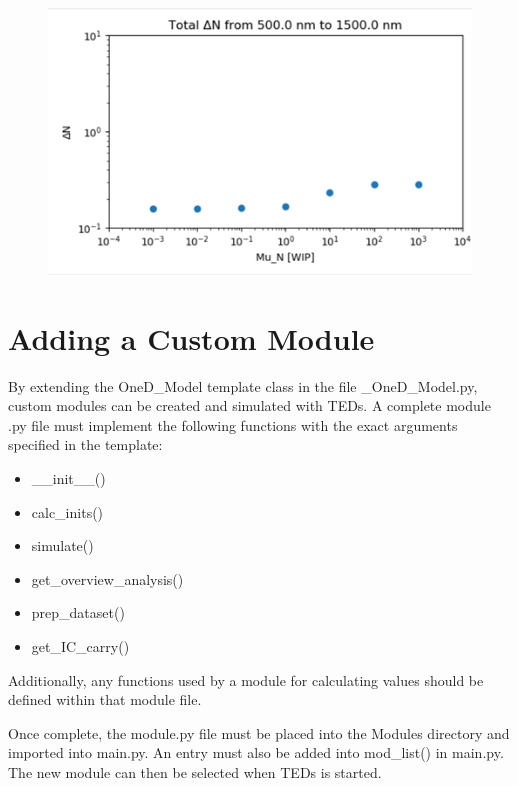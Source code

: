 \documentclass[11pt,letterpaper,titlepage]{article}
\begin{document}
		\begin{figure}[H]
			\label{fig:integration_result_adj}
			\centering
			\includegraphics{"integration_result_adj"}
		\end{figure}
	
	\newpage
	\section{Adding a Custom Module}
	
		\par By extending the OneD\_Model template class in the file \_OneD\_Model.py, custom modules can be created and simulated with TEDs. A complete module .py file must implement the following functions with the exact arguments specified in the template:
		
		\begin{itemize}
			\item \_\_init\_\_()
			\item calc\_inits()
			\item simulate()
			\item get\_overview\_analysis()
			\item prep\_dataset()
			\item get\_IC\_carry()
		\end{itemize}
	
		\par Additionally, any functions used by a module for calculating values should be defined within that module file. 
	
		\par Once complete, the module.py file must be placed into the Modules directory and imported into main.py. An entry must also be added into mod\_list() in main.py. The new module can then be selected when TEDs is started.
		
\end{document}
